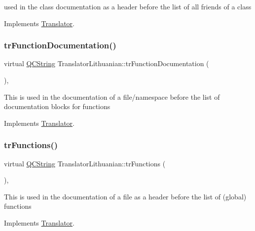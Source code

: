 used in the class documentation as a header before the list of all friends of a class 

Implements \mbox{\hyperlink{class_translator}{Translator}}.

\mbox{\label{class_translator_lithuanian_a5db4bba0547816a3d73913cca4abc9ee}} 
\subsubsection{\texorpdfstring{trFunctionDocumentation()}{trFunctionDocumentation()}}
{\footnotesize\ttfamily virtual \mbox{\hyperlink{class_q_c_string}{Q\+C\+String}} Translator\+Lithuanian\+::tr\+Function\+Documentation (\begin{DoxyParamCaption}{ }\end{DoxyParamCaption})\hspace{0.3cm}{\ttfamily [inline]}, {\ttfamily [virtual]}}

This is used in the documentation of a file/namespace before the list of documentation blocks for functions 

Implements \mbox{\hyperlink{class_translator}{Translator}}.

\mbox{\label{class_translator_lithuanian_a6b0c4c5292ff5ee7941931afe15002b2}} 
\subsubsection{\texorpdfstring{trFunctions()}{trFunctions()}}
{\footnotesize\ttfamily virtual \mbox{\hyperlink{class_q_c_string}{Q\+C\+String}} Translator\+Lithuanian\+::tr\+Functions (\begin{DoxyParamCaption}{ }\end{DoxyParamCaption})\hspace{0.3cm}{\ttfamily [inline]}, {\ttfamily [virtual]}}

This is used in the documentation of a file as a header before the list of (global) functions 

Implements \mbox{\hyperlink{class_translator}{Translator}}.

